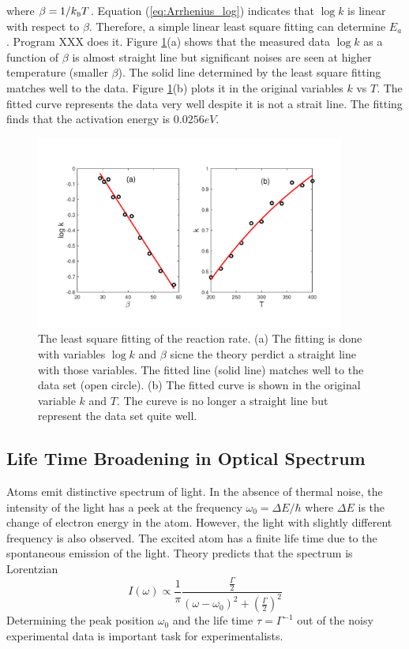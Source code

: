 where $\beta = 1/k_\textsc{b} T$. Equation (\ref{eq:Arrhenius_log}) indicates that $\log k$ is linear with respect to $\beta$.  Therefore, a simple linear least square fitting can determine $E_a$.
Program XXX does it.  Figure \ref{fig:Arrhenius}(a) shows that the measured data $\log k$ as a function of $\beta$ is almost straight line but significant noises are seen at higher temperature (smaller $\beta$).  The solid line determined by the least square fitting matches well to the data. Figure \ref{fig:Arrhenius}(b) plots it in the original variables $k$ vs $T$. The fitted curve represents the data very well despite it is not a strait line.  The fitting finds that the activation energy is $0.0256 eV$.

\begin{figure}
\centering
\includegraphics[width=4in]{12.fitting/arrhenius.pdf}
\caption{The least square fitting of the reaction rate.  (a) The fitting is done with variables $\log k$ and  $\beta$ sicne the theory perdict a straight line with those variables. The fitted line (solid line) matches well to the data set (open circle).  (b) The fitted curve is shown in the original variable $k$ and $T$.  The cureve is no longer a straight line but represent the data set quite well.} \label{fig:Arrhenius}
\end{figure}

\subsection{Life Time Broadening in Optical Spectrum}\label{sec:Lorentzian}

Atoms emit distinctive spectrum of light.  In the absence of thermal noise, the intensity of the light
has a peek at the frequency $\omega_0 = \Delta E /\hbar$ where $\Delta E$ is the change of electron energy in the atom.
However, the light with slightly different frequency is also observed. The excited atom has a finite life time due to the spontaneous emission of the light.  Theory predicts that the spectrum is Lorentzian
\begin{equation}
I(\omega) \propto \frac{1}{\pi} \frac{\displaystyle\frac{\Gamma}{2}}{(\omega-\omega_0)^2 + \left ( \displaystyle\frac{\Gamma}{2} \right )^2}
\end{equation}
Determining the peak position $\omega_0$ and the life time $\tau = \Gamma^{-1}$ out of the noisy experimental data is important task for experimentalists.

